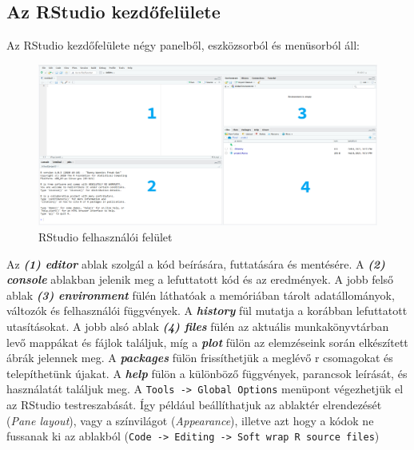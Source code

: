 \documentclass[
]{book}
\begin{document}
\hypertarget{az-rstudio-kezdux151feluxfclete}{%
\subsection{Az RStudio
kezdőfelülete}\label{az-rstudio-kezdux151feluxfclete}}

Az RStudio kezdőfelülete négy panelből, eszközsorból és menüsorból áll:

\begin{figure}

{\centering \includegraphics{figures/13-01_layout} 

}

\caption{RStudio felhasználói felület}\label{fig:unnamed-chunk-17}
\end{figure}

Az \textbf{\emph{(1) editor}} ablak szolgál a kód beírására, futtatására
és mentésére. A \textbf{\emph{(2) console}} ablakban jelenik meg a
lefuttatott kód és az eredmények. A jobb felső ablak \textbf{\emph{(3)
environment}} fülén láthatóak a memóriában tárolt adatállományok,
változók és felhasználói függvények. A \textbf{\emph{history}} fül
mutatja a korábban lefuttatott utasításokat. A jobb alsó ablak
\textbf{\emph{(4) files}} fülén az aktuális munkakönyvtárban levő
mappákat és fájlok találjuk, míg a \textbf{\emph{plot}} fülön az
elemzéseink során elkészített ábrák jelennek meg. A
\textbf{\emph{packages}} fülön frissíthetjük a meglévő r csomagokat és
telepíthetünk újakat. A \textbf{\emph{help}} fülön a különböző
függvények, parancsok leírását, és használatát találjuk meg. A
\texttt{Tools\ -\textgreater{}\ Global\ Options} menüpont végezhetjük el
az RStudio testreszabását. Így például beállíthatjuk az ablaktér
elrendezését (\emph{Pane layout}), vagy a színvilágot
(\emph{Appearance}), illetve azt hogy a kódok ne fussanak ki az ablakból
(\texttt{Code\ -\textgreater{}\ Editing\ -\textgreater{}\ Soft\ wrap\ R\ source\ files})
\end{document}
